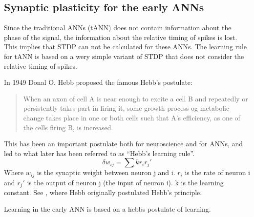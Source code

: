 





		\subsection{Synaptic plasticity for the early ANNs} %
Since the traditional ANNs (tANN) does not contain information about the phase of the signal, the information about the relative timing of spikes is lost. This implies that STDP can not be calculated for these ANNs. 
The learning rule for tANN is based on a wery simple variant of STDP that does not consider the relative timing of spikes.

In 1949 Donal O. Hebb proposed the famous Hebb's postulate:
\begin{quote}
When an axon of cell A is near enough to excite a cell B and repeatedly or persistently takes part in firing it, some growth process og metabolic change takes place in one or both cells such that A's efficiency, as one of the cells firing B, is increased.\cite{Hebb1949Kap4}
\end{quote}

This has been an important postulate both for neuroscience and for ANNs, and led to what later has been referred to as ``Hebb's learning rule''.
\begin{equation}
	\delta w_{ij} = \sum{k r_i r_j'}
\end{equation}
Where $w_{ij}$ is the synaptic weight between neuron j and i. $r_i$ is the rate of neuron i and $r_j'$ is the output of neuron j (the input of neuron i). \mbox{k} is the learning constant. See \cite{Hebb1949Kap4}, where Hebb originally postulated Hebb's principle.

Learning in the early ANN is based on a hebbs postulate of learning. %

